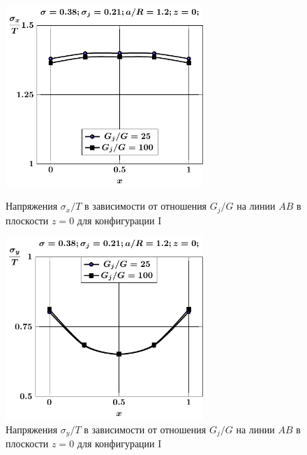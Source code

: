 \begin{russian}
\begin{figure}[h!]
\centering\footnotesize
\parbox[b]{7.5cm}{\centering\includegraphics[width=7.5cm]{inc2a-g-a12-h10-r10-z0-sig_x.pdf}
\caption{Напряжения $\sigma_x/T$ в зависимости от отношения $G_j/G$ на линии $AB$ в плоскости $z=0$ для конфигурации I
\label{f:7:105}}}\hfil\hfil
\parbox[b]{7.5cm}{\centering\includegraphics[width=7.5cm]{inc2a-g-a12-h10-r10-z0-sig_y.pdf}
\caption{Напряжения $\sigma_y/T$ в зависимости от отношения $G_j/G$ на линии $AB$ в плоскости $z=0$ для конфигурации I
\label{f:7:106}}}
\end{figure}


\end{russian}
